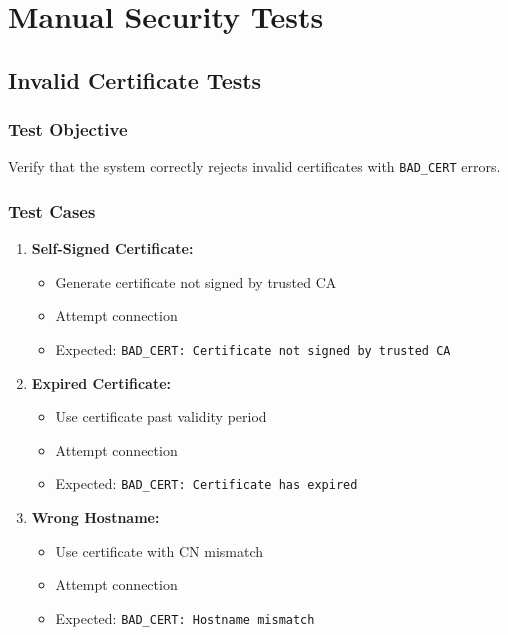 \documentclass[runningheads]{llncs}
\begin{document}
\section{Manual Security Tests}

\subsection{Invalid Certificate Tests}

\subsubsection{Test Objective}

Verify that the system correctly rejects invalid certificates with \texttt{BAD\_CERT} errors.

\subsubsection{Test Cases}

\begin{enumerate}
    \item \textbf{Self-Signed Certificate:}
    \begin{itemize}
        \item Generate certificate not signed by trusted CA
        \item Attempt connection
        \item Expected: \texttt{BAD\_CERT: Certificate not signed by trusted CA}
    \end{itemize}
    
    \item \textbf{Expired Certificate:}
    \begin{itemize}
        \item Use certificate past validity period
        \item Attempt connection
        \item Expected: \texttt{BAD\_CERT: Certificate has expired}
    \end{itemize}
    
    \item \textbf{Wrong Hostname:}
    \begin{itemize}
        \item Use certificate with CN mismatch
        \item Attempt connection
        \item Expected: \texttt{BAD\_CERT: Hostname mismatch}
    \end{itemize}
\end{enumerate}
\end{document}
